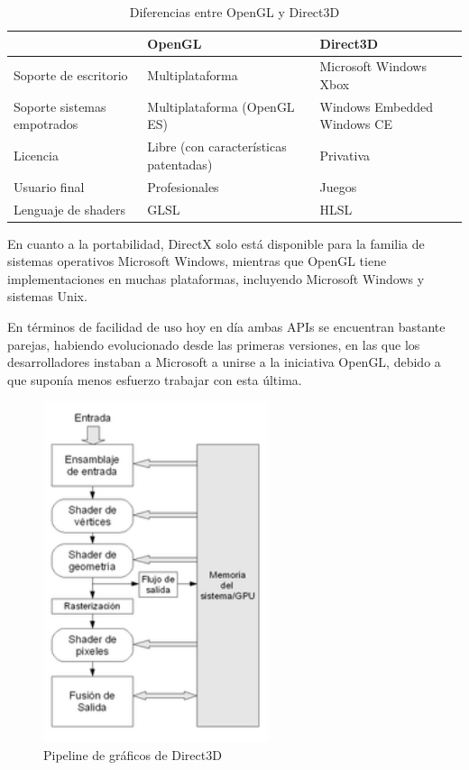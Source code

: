 \begin{table}[h]
	\centering
	\begin{tabular}{ | m{4cm} | m{5cm} | m{5cm} | }
		\hline
		& OpenGL & Direct3D \\
		\hline
		Soporte de escritorio & Multiplataforma & Microsoft Windows Xbox
		\\
		\hline
		Soporte sistemas empotrados & Multiplataforma (OpenGL ES) & Windows
		Embedded Windows CE \\
		\hline
		Licencia & Libre (con características patentadas) & Privativa
		\\
		\hline
		Usuario final & Profesionales & Juegos \\ 
		\hline
		Lenguaje de shaders & GLSL & HLSL \\
		\hline
	\end{tabular}
	\caption{Diferencias entre OpenGL y Direct3D}
	\label{tabla2.1}
\end{table}

En cuanto a la portabilidad, DirectX solo está disponible para la familia de
sistemas operativos Microsoft Windows, mientras que OpenGL tiene
implementaciones en muchas plataformas, incluyendo Microsoft Windows y sistemas
Unix.

En términos de facilidad de uso hoy en día ambas APIs se encuentran bastante
parejas, habiendo evolucionado desde las primeras versiones, en las que los
desarrolladores instaban a Microsoft a unirse a la iniciativa OpenGL, debido a
que suponía menos esfuerzo trabajar con esta última.

\begin{figure}
	\centering
	\includegraphics[height=10cm]{figures/directxpipeline.png}
	\caption{Pipeline de gráficos de Direct3D}
	\label{fig:differences}
\end{figure}


